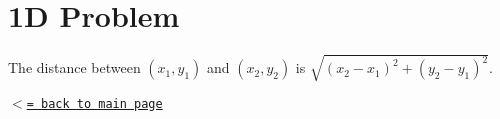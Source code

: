\hypertarget{__diffusion__diffusion_1D}{}\section{1\+D Problem}\label{__diffusion__diffusion_1D}
The distance between $(x_1,y_1)$ and $(x_2,y_2)$ is $\sqrt{(x_2-x_1)^2+(y_2-y_1)^2}$.

\href{index.html}{\tt $<$= back to main page} 